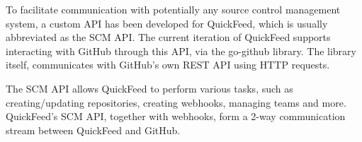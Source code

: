 To facilitate communication with potentially any source control management system, a custom API has been developed for QuickFeed, which is usually abbreviated as the SCM API.
The current iteration of QuickFeed supports interacting with GitHub through this API, via the go-github library. %
The library itself, communicates with GitHub's own REST API using HTTP requests.

The SCM API allows QuickFeed to perform various tasks, such as creating/updating repositories, creating webhooks, managing teams and more.
QuickFeed's SCM API, together with webhooks, form a 2-way communication stream between QuickFeed and GitHub.